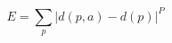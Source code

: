\begin{equation}
    \label{eq:pnorm-error}
    E = \sum_p{\left| d(p, a) - d(p) \right|^P}
\end{equation}